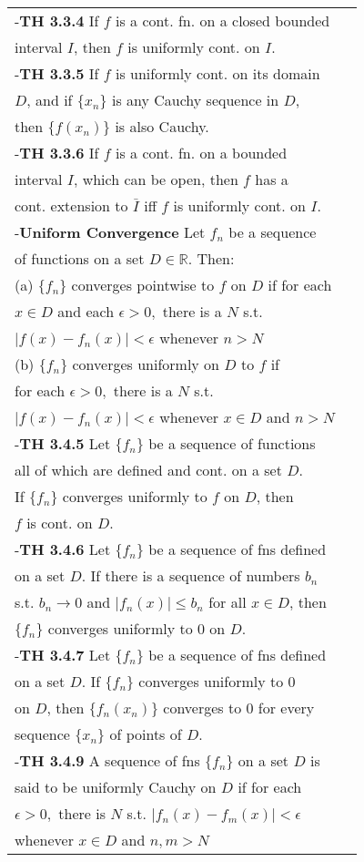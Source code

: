 \documentclass[10 pt,landscape]{article}
\begin{document}
\begin{multicols}{4}
\begin{tabular}{@{}ll@{}}
-\textbf{TH 3.3.4} If $f$ is a cont. fn. on a closed bounded \\interval $I$, then $f$ is uniformly cont. on $I$.\\
-\textbf{TH 3.3.5} If $f$ is uniformly cont. on its domain\\ $D$, and if $\{x_n\}$ is any Cauchy sequence in $D$,\\ then $\{f(x_n)\}$ is also Cauchy.\\
-\textbf{TH 3.3.6} If $f$ is a cont. fn. on a bounded\\ interval $I$, which can be open, then $f$ has a\\ cont. extension to $\bar{I}$ iff $f$ is uniformly cont. on $I$.\\
-\textbf{Uniform Convergence} Let $f_n$ be a sequence\\ of functions on a set $D \in \mathbb{R}$. Then: \\
(a) $\{f_n\}$ converges pointwise to $f$ on $D$ if for each \\$x \in D$ and each $\epsilon >0,$ there is a $N$ s.t.\\
$|f(x)-f_n(x)|< \epsilon $ whenever $ n>N$\\
(b) $\{f_n\}$ converges uniformly on $D$ to $f$ if\\ for each $\epsilon >0,$ there is a $N$ s.t.\\
$|f(x)-f_n(x)|< \epsilon $ whenever $x\in D$ and $ n>N$\\
-\textbf{TH 3.4.5} Let $\{f_n\}$ be a sequence of functions\\ all of which are defined and cont. on a set $D$.\\ If $\{f_n\}$ converges uniformly to $f$ on $D$, then \\$f$ is cont. on $D$.\\
-\textbf{TH 3.4.6} Let $\{f_n\}$ be a sequence of fns defined\\ on a set $D$. If there is a sequence of numbers $b_n$\\ s.t. $b_n \rightarrow 0$ and $|f_n (x)| \leq b_n$ for all $x\in D$, then\\ $\{f_n\}$ converges uniformly to $0$ on $D$. \\
-\textbf{TH 3.4.7} Let $\{f_n\}$ be a sequence of fns defined\\ on a set $D$. If $\{f_n\}$ converges uniformly to 0 \\ on $D$, then $\{f_n(x_n)\}$ converges to 0 for every \\sequence $\{x_n\}$ of points of $D$.\\
-\textbf{TH 3.4.9} A sequence of fns $\{f_n\}$ on a set $D$ is\\ said to be  uniformly Cauchy on $D$ if for each\\ $\epsilon >0,$ there is $N$ s.t. $|f_n(x)-f_m(x)| < \epsilon$\\ whenever $x \in D$ and $n,m>N$


\end{tabular}
\end{multicols}
\end{document}
